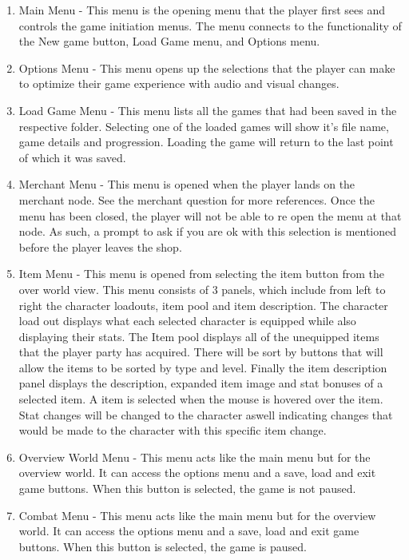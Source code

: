 \documentclass[12pt, titlepage]{article}
\begin{document}
\begin{enumerate}
	\begin{enumerate}
	\item Main Menu - This menu is the opening menu that the player first sees and controls the game initiation menus. The menu connects to the functionality of  the New game button, Load Game menu, and Options menu.
	\item Options Menu - This menu opens up the selections that the player can make to optimize their game experience with audio and visual changes.
	\item Load Game Menu - This menu lists all the games that had been saved in the respective folder. Selecting one of the loaded games will show it's file name, game details and progression. Loading the game will return to the last point of which it was saved.
	\item Merchant Menu - This menu is opened when the player lands on the merchant node. See the merchant question for more references. Once the menu has been closed, the player will not be able to re open the menu at that node. As such, a prompt to ask if you are ok with this selection is mentioned before the player leaves the shop. %
	\item Item Menu - This menu is opened from selecting the item button from the over world view. This menu consists of 3 panels, which include from left to right the character loadouts, item pool and item description. The character load out displays what each selected character is equipped while also displaying their stats. The Item pool displays all of the unequipped items that the player party has acquired. There will be sort by buttons that will allow the items to be sorted by type and level. Finally the item description panel displays the description, expanded item image and stat bonuses of a selected item. A item is selected when the mouse is hovered over the item. Stat changes will be changed to the character aswell indicating changes that would be made to the character with this specific item change. 
	\item Overview World Menu - This menu acts like the main menu but for the overview world. It can access the options menu and a save, load and exit game buttons. When this button is selected, the game is not paused.
	\item Combat Menu - This menu acts like the main menu but for the overview world. It can access the options menu and a save, load and exit game buttons. When this button is selected, the game is paused.
	\end{enumerate}

\end{enumerate}
\end{document}
